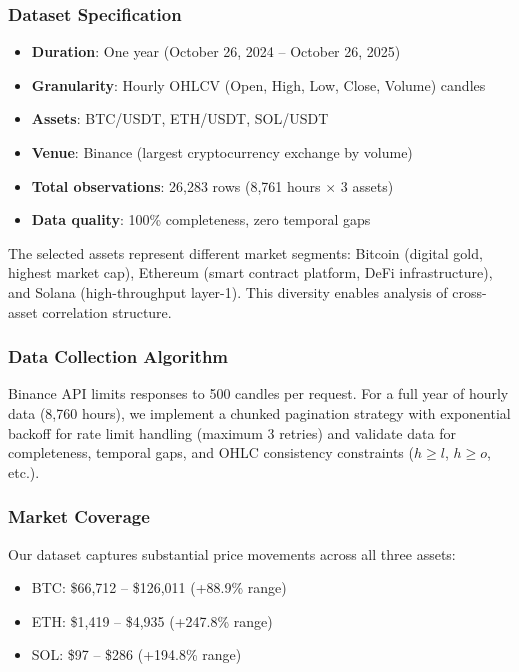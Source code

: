 \documentclass{article}
\begin{document}
\subsubsection{Dataset Specification}

\begin{itemize}[leftmargin=*]
    \item \textbf{Duration}: One year (October 26, 2024 -- October 26, 2025)
    \item \textbf{Granularity}: Hourly OHLCV (Open, High, Low, Close, Volume) candles
    \item \textbf{Assets}: BTC/USDT, ETH/USDT, SOL/USDT
    \item \textbf{Venue}: Binance (largest cryptocurrency exchange by volume)
    \item \textbf{Total observations}: 26,283 rows (8,761 hours $\times$ 3 assets)
    \item \textbf{Data quality}: 100\% completeness, zero temporal gaps
\end{itemize}

The selected assets represent different market segments: Bitcoin (digital gold, highest market cap), Ethereum (smart contract platform, DeFi infrastructure), and Solana (high-throughput layer-1). This diversity enables analysis of cross-asset correlation structure.

\subsubsection{Data Collection Algorithm}

Binance API limits responses to 500 candles per request. For a full year of hourly data (8,760 hours), we implement a chunked pagination strategy with exponential backoff for rate limit handling (maximum 3 retries) and validate data for completeness, temporal gaps, and OHLC consistency constraints ($h \geq l$, $h \geq o$, etc.).

\subsubsection{Market Coverage}

Our dataset captures substantial price movements across all three assets:

\begin{itemize}[leftmargin=*]
    \item BTC: \$66,712 -- \$126,011 (+88.9\% range)
    \item ETH: \$1,419 -- \$4,935 (+247.8\% range)
    \item SOL: \$97 -- \$286 (+194.8\% range)
\end{itemize}
\end{document}
